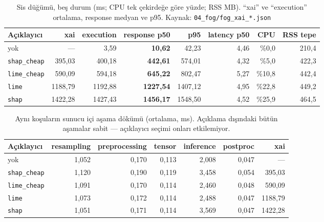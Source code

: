 \documentclass[11pt,a4paper]{report}
\newcommand{\kod}[1]{\texttt{\small #1}}
\newcommand{\dosya}[1]{\texttt{\footnotesize #1}}
\begin{document}
\begin{table}[H]
\centering\footnotesize
\begin{tabular}{@{}lrrrrrrr@{}}
\toprule
\textbf{Açıklayıcı} & \textbf{xai} & \textbf{execution} & \textbf{response p50} & \textbf{p95} & \textbf{latency p50} & \textbf{CPU} & \textbf{RSS tepe} \\
\midrule
yok                & ---       & 3{,}59  & \textbf{10{,}62}  & 42{,}23  & 4{,}46 & \%0{,}0 & 210{,}4 \\
\kod{shap\_cheap}  & 395{,}03  & 400{,}18 & \textbf{442{,}61} & 574{,}01 & 4{,}32 & \%5{,}0 & 422{,}3 \\
\kod{lime\_cheap}  & 590{,}09  & 594{,}18 & \textbf{645{,}22} & 802{,}47 & 5{,}27 & \%10{,}8 & 442{,}4 \\
\kod{lime}         & 1188{,}79 & 1192{,}88 & \textbf{1227{,}54} & 1407{,}12 & 4{,}95 & \%22{,}8 & 449{,}2 \\
\kod{shap}         & 1422{,}28 & 1427{,}43 & \textbf{1456{,}17} & 1548{,}50 & 4{,}52 & \%25{,}9 & 464{,}5 \\
\bottomrule
\end{tabular}
\caption{Sis düğümü, beş durum (ms; CPU tek çekirdeğe göre yüzde; RSS MB).
``xai'' ve ``execution'' ortalama, response medyan ve p95.
Kaynak: \dosya{04\_fog/fog\_xai\_*.json}}
\label{tab:fog}
\end{table}

\begin{table}[H]
\centering\footnotesize
\begin{tabular}{@{}lrrrrrr@{}}
\toprule
\textbf{Açıklayıcı} & \textbf{resampling} & \textbf{preprocessing} & \textbf{tensor} & \textbf{inference} & \textbf{postproc} & \textbf{xai} \\
\midrule
yok               & 1{,}052 & 0{,}170 & 0{,}113 & 2{,}008 & 0{,}047 & --- \\
\kod{shap\_cheap} & 1{,}120 & 0{,}190 & 0{,}119 & 3{,}458 & 0{,}054 & 395{,}03 \\
\kod{lime\_cheap} & 1{,}091 & 0{,}170 & 0{,}114 & 2{,}460 & 0{,}048 & 590{,}09 \\
\kod{lime}        & 1{,}073 & 0{,}172 & 0{,}114 & 2{,}488 & 0{,}047 & 1188{,}79 \\
\kod{shap}        & 1{,}051 & 0{,}171 & 0{,}114 & 3{,}569 & 0{,}047 & 1422{,}28 \\
\bottomrule
\end{tabular}
\caption{Aynı koşuların sunucu içi aşama dökümü (ortalama, ms). Açıklama
dışındaki bütün aşamalar sabit --- açıklayıcı seçimi onları etkilemiyor.}
\end{table}
\end{document}
